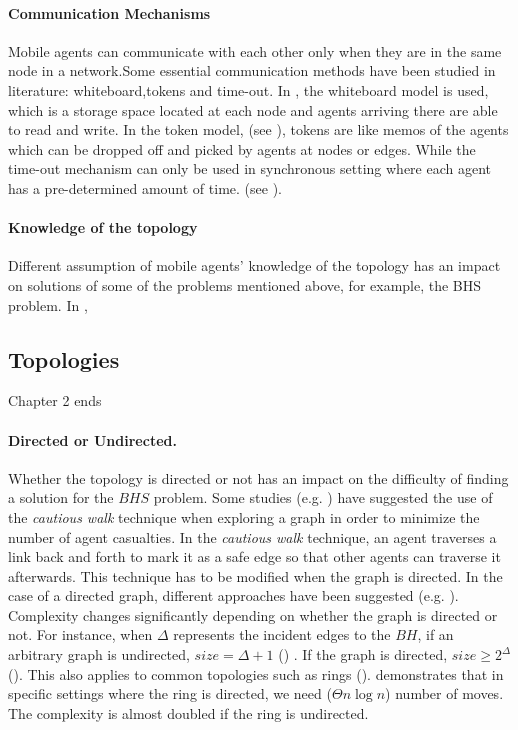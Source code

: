 \paragraph{Communication Mechanisms} 
Mobile agents can communicate with each other only when they are in the same node in a network.Some essential communication methods have been studied in literature: whiteboard,tokens and time-out. In \cite{J.C, Dobr, Flocchini4, A.K}, the whiteboard model is used, which is a storage space located at each node and agents arriving there are able to read and write. In the token model, (see \cite{ J.C1, Flocchini4}), tokens are like memos of the agents which can be dropped off and picked by agents at nodes or edges. While the time-out mechanism can only be used in synchronous setting where each agent has a pre-determined amount of time. (see \cite{C.C, C.C1, J.C2}).
\paragraph{Knowledge of the topology} 
Different assumption of mobile agents' knowledge of the topology has an impact on solutions of some of the problems mentioned above, for example, the BHS problem. In \cite{Dobr}, 

\subsection{Topologies}

Chapter 2 ends

\paragraph{Directed or Undirected.}
Whether the topology is directed or not has an impact on the difficulty of finding a solution for the $BHS$ problem. Some studies (e.g. \cite{dobetal8,dobetal6,czyetal1,dobetal7})  have suggested the use of the {\em cautious walk} technique when exploring a graph in order to minimize the number of agent casualties. In the {\em cautious walk} technique,  an agent traverses a link back and forth to mark it as a safe edge so that other agents can traverse it afterwards. This technique has to be  modified when the graph is directed. In the case of a directed graph, different approaches have been suggested (e.g. \cite{kosetal15,czyetal2,dobetal8}).
Complexity changes significantly depending on whether the graph is directed or not. For instance, when $\Delta$ represents the incident edges to the $BH$, if  an arbitrary graph is undirected, $size= \Delta+1$ (\cite{dobetal7}) . If the graph is directed, $size\ge2^{\Delta} $ (\cite{czyetal2}). This also applies to common topologies such as rings  (\cite{dobetal8}). \cite{dobetal8} demonstrates that in specific settings where the ring is directed, we need ($\Theta n \log n$) number of moves. The complexity is almost doubled if the ring is undirected.

